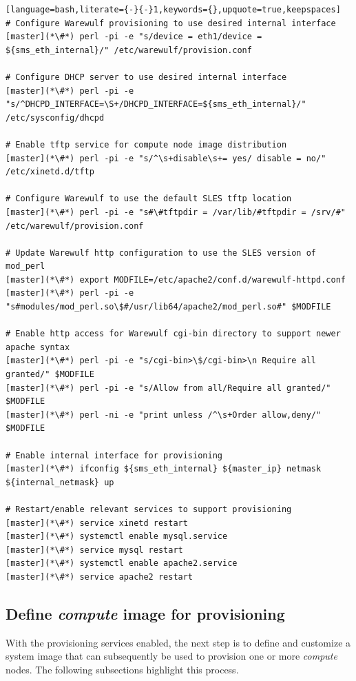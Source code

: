 \documentclass[letterpaper]{article}
\begin{document}
\begin{lstlisting}[language=bash,literate={-}{-}1,keywords={},upquote=true,keepspaces]
# Configure Warewulf provisioning to use desired internal interface
[master](*\#*) perl -pi -e "s/device = eth1/device = ${sms_eth_internal}/" /etc/warewulf/provision.conf

# Configure DHCP server to use desired internal interface
[master](*\#*) perl -pi -e "s/^DHCPD_INTERFACE=\S+/DHCPD_INTERFACE=${sms_eth_internal}/" /etc/sysconfig/dhcpd

# Enable tftp service for compute node image distribution
[master](*\#*) perl -pi -e "s/^\s+disable\s+= yes/ disable = no/" /etc/xinetd.d/tftp

# Configure Warewulf to use the default SLES tftp location
[master](*\#*) perl -pi -e "s#\#tftpdir = /var/lib/#tftpdir = /srv/#" /etc/warewulf/provision.conf

# Update Warewulf http configuration to use the SLES version of mod_perl
[master](*\#*) export MODFILE=/etc/apache2/conf.d/warewulf-httpd.conf
[master](*\#*) perl -pi -e "s#modules/mod_perl.so\$#/usr/lib64/apache2/mod_perl.so#" $MODFILE

# Enable http access for Warewulf cgi-bin directory to support newer apache syntax
[master](*\#*) perl -pi -e "s/cgi-bin>\$/cgi-bin>\n Require all granted/" $MODFILE
[master](*\#*) perl -pi -e "s/Allow from all/Require all granted/" $MODFILE
[master](*\#*) perl -ni -e "print unless /^\s+Order allow,deny/" $MODFILE

# Enable internal interface for provisioning
[master](*\#*) ifconfig ${sms_eth_internal} ${master_ip} netmask ${internal_netmask} up

# Restart/enable relevant services to support provisioning
[master](*\#*) service xinetd restart
[master](*\#*) systemctl enable mysql.service
[master](*\#*) service mysql restart                          
[master](*\#*) systemctl enable apache2.service
[master](*\#*) service apache2 restart
\end{lstlisting}

\subsection{Define {\em compute} image for provisioning}

With the provisioning services enabled, the next step is to define and
customize a system image that can subsequently be used to provision one or more
{\em compute} nodes. The following subsections highlight this process.
\end{document}
